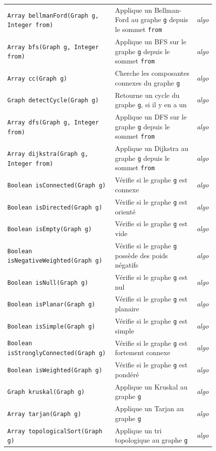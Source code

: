 \documentclass[french]{article}
\begin{document}
\begin{figure}[H]
\begin{longtable}{p{}p{}p{}}
					\texttt{Array bellmanFord(Graph g, Integer from)} & Applique un Bellman-Ford au graphe \texttt{g} depuis le sommet \texttt{from} & \textit{algo}\\
					\texttt{Array bfs(Graph g, Integer from)} & Applique un BFS sur le graphe \texttt{g} depuis le sommet \texttt{from} & \textit{algo}\\
					\texttt{Array cc(Graph g)} & Cherche les composantes connexes du graphe \texttt{g} & \textit{algo}\\
					\texttt{Graph detectCycle(Graph g)} & Retourne un cycle du graphe \texttt{g}, si il y en a un & \textit{algo}\\
					\texttt{Array dfs(Graph g, Integer from)} & Applique un DFS sur le graphe \texttt{g} depuis le sommet \texttt{from} & \textit{algo}\\
					\texttt{Array dijkstra(Graph g, Integer from)} & Applique un Dijkstra au graphe \texttt{g} depuis le sommet \texttt{from} & \textit{algo}\\
					\texttt{Boolean isConnected(Graph g)} & Vérifie si le graphe \texttt{g} est connexe & \textit{algo}\\
					\texttt{Boolean isDirected(Graph g)} & Vérifie si le graphe \texttt{g} est orienté & \textit{algo}\\
					\texttt{Boolean isEmpty(Graph g)} & Vérifie si le graphe \texttt{g} est vide & \textit{algo}\\
					\texttt{Boolean isNegativeWeighted(Graph g)} & Vérifie si le graphe \texttt{g} possède des poids négatifs & \textit{algo}\\
					\texttt{Boolean isNull(Graph g)} & Vérifie si le graphe \texttt{g} est nul & \textit{algo}\\
					\texttt{Boolean isPlanar(Graph g)} & Vérifie si le graphe \texttt{g} est planaire & \textit{algo}\\
					\texttt{Boolean isSimple(Graph g)} & Vérifie si le graphe \texttt{g} est simple & \textit{algo}\\
					\texttt{Boolean isStronglyConnected(Graph g)} & Vérifie si le graphe \texttt{g} est fortement connexe & \textit{algo}\\
					\texttt{Boolean isWeighted(Graph g)} & Vérifie si le graphe \texttt{g} est pondéré & \textit{algo}\\
					\texttt{Graph kruskal(Graph g)} & Applique un Kruskal au graphe \texttt{g} & \textit{algo}\\
					\texttt{Array tarjan(Graph g)} & Applique un Tarjan au graphe \texttt{g} & \textit{algo}\\
					\texttt{Array topologicalSort(Graph g)} & Applique un tri topologique au graphe \texttt{g} & \textit{algo}\\
				\end{longtable}
			\end{figure}
		
\end{document}

